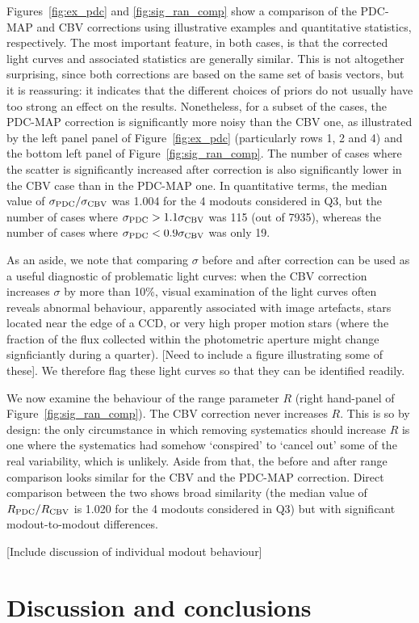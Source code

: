 \documentclass[useAMS,usenatbib]{mn2e}
\begin{document}
Figures~\ref{fig:ex_pdc} and \ref{fig:sig_ran_comp} show a comparison
of the PDC-MAP and CBV corrections using illustrative examples and
quantitative statistics, respectively. The most important feature, in
both cases, is that the corrected light curves and associated
statistics are generally similar. This is not altogether surprising,
since both corrections are based on the same set of basis vectors, but
it is reassuring: it indicates that the different choices of priors do
not usually have too strong an effect on the results. Nonetheless, for
a subset of the cases, the PDC-MAP correction is significantly more
noisy than the CBV one, as illustrated by the left panel panel of
Figure~\ref{fig:ex_pdc} (particularly rows 1, 2 and 4) and the bottom
left panel of Figure~\ref{fig:sig_ran_comp}. The number of cases where
the scatter is significantly increased after correction is also
significantly lower in the CBV case than in the PDC-MAP one. In
quantitative terms, the median value of $\sigma_{\rm PDC}/\sigma_{\rm
  CBV}$ was 1.004 for the 4 modouts considered in Q3, but the number of
cases where $\sigma_{\rm PDC}>1.1 \sigma_{\rm CBV}$ was 115 (out of
7935), whereas the number of cases where $\sigma_{\rm PDC}<0.9
\sigma_{\rm CBV}$ was only 19.

As an aside, we note that comparing $\sigma$ before and after
correction can be used as a useful diagnostic of problematic light
curves: when the CBV correction increases $\sigma$ by
more than 10\%, visual examination of the light curves often reveals
abnormal behaviour, apparently associated with image artefacts, stars
located near the edge of a CCD, or very high proper motion stars
(where the fraction of the flux collected within the photometric
aperture might change signficiantly during a quarter). [Need to
include a figure illustrating some of these]. We therefore flag these
light curves so that they can be identified readily. 

We now examine the behaviour of the range parameter $R$ (right
hand-panel of Figure~\ref{fig:sig_ran_comp}). The CBV correction
never increases $R$. This is so by design: the only circumstance in
which removing systematics should increase $R$ is one where the
systematics had somehow `conspired' to `cancel out' some of the real
variability, which is unlikely. Aside from that, the before and after
range comparison looks similar for the CBV and the PDC-MAP
correction. Direct comparison between the two shows broad similarity
(the median value of $R_{\rm PDC}/R_{\rm CBV}$ is 1.020 for the 4
modouts considered in Q3) but with significant modout-to-modout
differences.

[Include discussion of individual modout behaviour]



\section{Discussion and conclusions}
\label{sec:concl}

\bsp

\label{lastpage}



\end{document}
